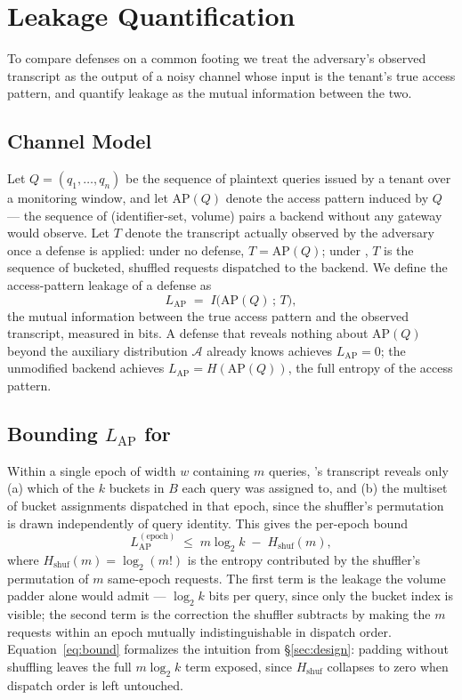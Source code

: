 \section{Leakage Quantification}
\label{sec:leakage}

To compare defenses on a common footing we treat the adversary's observed
transcript as the output of a noisy channel whose input is the tenant's
true access pattern, and quantify leakage as the mutual information
between the two.

\subsection{Channel Model}
Let $Q = (q_1, \dots, q_n)$ be the sequence of plaintext queries issued by
a tenant over a monitoring window, and let $\mathrm{AP}(Q)$ denote the
access pattern induced by $Q$ --- the sequence of (identifier-set, volume)
pairs a backend without any gateway would observe. Let $T$ denote the
transcript actually observed by the adversary once a defense is applied:
under no defense, $T = \mathrm{AP}(Q)$; under \sysname{}, $T$ is the
sequence of bucketed, shuffled requests dispatched to the backend. We
define the access-pattern leakage of a defense as
\begin{equation}
  \label{eq:leakage}
  L_{\mathrm{AP}} \;=\; I\big(\mathrm{AP}(Q) \,;\, T\big),
\end{equation}
the mutual information between the true access pattern and the observed
transcript, measured in bits. A defense that reveals nothing about
$\mathrm{AP}(Q)$ beyond the auxiliary distribution $\mathcal{A}$ already
knows achieves $L_{\mathrm{AP}} = 0$; the unmodified backend achieves
$L_{\mathrm{AP}} = H(\mathrm{AP}(Q))$, the full entropy of the access
pattern.

\subsection{Bounding \texorpdfstring{$L_{\mathrm{AP}}$}{L\_AP} for \sysname{}}
Within a single epoch of width $w$ containing $m$ queries, \sysname{}'s
transcript reveals only (a) which of the $k$ buckets in $B$ each query was
assigned to, and (b) the multiset of bucket assignments dispatched in that
epoch, since the shuffler's permutation is drawn independently of query
identity. This gives the per-epoch bound
\begin{equation}
  \label{eq:bound}
  L_{\mathrm{AP}}^{(\text{epoch})} \;\le\; m \log_2 k \;-\; H_{\mathrm{shuf}}(m),
\end{equation}
where $H_{\mathrm{shuf}}(m) = \log_2(m!)$ is the entropy contributed by the
shuffler's permutation of $m$ same-epoch requests. The first term is the
leakage the volume padder alone would admit --- $\log_2 k$ bits per query,
since only the bucket index is visible; the second term is the correction
the shuffler subtracts by making the $m$ requests within an epoch
mutually indistinguishable in dispatch order. Equation~\ref{eq:bound}
formalizes the intuition from \S\ref{sec:design}: padding without
shuffling leaves the full $m \log_2 k$ term exposed, since $H_{\mathrm{shuf}}$
collapses to zero when dispatch order is left untouched.

